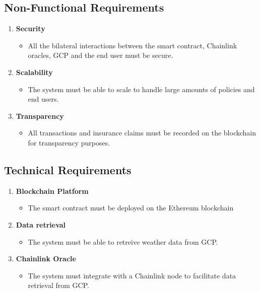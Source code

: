 \subsection{Non-Functional Requirements}

\begin{enumerate}
    \item \textbf{Security}
    \begin{itemize}
        \item All the bilateral interactions between the smart contract, Chainlink oracles, GCP and the end user must be secure.
    \end{itemize}
    
    \item \textbf{Scalability}
    \begin{itemize}
        \item The system must be able to scale to handle large amounts of policies and end users.
    \end{itemize}
    
    \item \textbf{Transparency}
    \begin{itemize}
        \item All transactions and insurance claims must be recorded on the blockchain for transparency purposes.
    \end{itemize}
\end{enumerate}

\subsection{Technical Requirements}\label{subsection:technicalRequirements}

\begin{enumerate}
    \item \textbf{Blockchain Platform}
    \begin{itemize}
        \item The smart contract must be deployed on the Ethereum blockchain
    \end{itemize}
    
    \item \textbf{Data retrieval}
    \begin{itemize}
        \item The system must be able to retreive weather data from GCP.
    \end{itemize}
    
    \item \textbf{Chainlink Oracle}
    \begin{itemize}
        \item The system must integrate with a Chainlink node to facilitate data retrieval from GCP.
    \end{itemize}
\end{enumerate}


